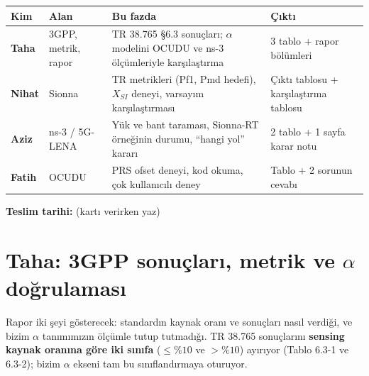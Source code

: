 \documentclass[10.5pt,a4paper]{article}
\begin{document}
\begingroup\sffamily\small
\begin{xltabular}{\textwidth}{@{}p{1.5cm}p{2.6cm}Xp{3.6cm}@{}}
\toprule
\textbf{Kim} & \textbf{Alan} & \textbf{Bu fazda} & \textbf{Çıktı} \\
\midrule
\textbf{Taha} & 3GPP, metrik, rapor & TR 38.765 §6.3 sonuçları; $\alpha$ modelini OCUDU ve ns-3 ölçümleriyle karşılaştırma & 3 tablo + rapor bölümleri \\
\textbf{Nihat} & Sionna & TR metrikleri (Pf1, Pmd hedefi), $X_{SI}$ deneyi, varsayım karşılaştırması & Çıktı tablosu + karşılaştırma tablosu \\
\textbf{Aziz} & ns-3 / 5G-LENA & Yük ve bant taraması, Sionna-RT örneğinin durumu, ``hangi yol'' kararı & 2 tablo + 1 sayfa karar notu \\
\textbf{Fatih} & OCUDU & PRS ofset deneyi, kod okuma, çok kullanıcılı deney & Tablo + 2 sorunun cevabı \\
\bottomrule
\end{xltabular}
\endgroup
\textbf{Teslim tarihi:} \underline{\hspace{4cm}} \quad (kartı verirken yaz)

\clearpage
\section*{Taha: 3GPP sonuçları, metrik ve $\alpha$ doğrulaması}
\begin{neden}
Rapor iki şeyi gösterecek: standardın kaynak oranı ve sonuçları nasıl verdiği, ve bizim $\alpha$ tanımımızın ölçümle tutup tutmadığı. TR 38.765 sonuçlarını \textbf{sensing kaynak oranına göre iki sınıfa} ($\le\%10$ ve $>\%10$) ayırıyor (Tablo 6.3-1 ve 6.3-2); bizim $\alpha$ ekseni tam bu sınıflandırmaya oturuyor.
\end{neden}
\end{document}
